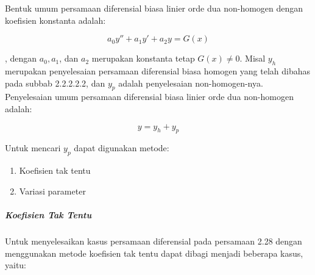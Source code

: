 Bentuk umum persamaan diferensial biasa linier orde dua non-homogen dengan koefisien konstanta adalah:

\begin{equation} a_0 y'' + a_1 y' + a_2 y = G(x) \end{equation}

, dengan \begin{math} a_0, a_1 \end{math}, dan \begin{math} a_2 \end{math} merupakan konstanta tetap \begin{math} G(x) \neq 0 \end{math}. Misal \begin{math} y_h \end{math} merupakan penyelesaian persamaan diferensial biasa homogen yang telah dibahas pada subbab 2.2.2.2.2, dan \begin{math} y_p \end{math} adalah penyelesaian non-homogen-nya. Penyelesaian umum persamaan diferensial biasa linier orde dua non-homogen adalah:

\begin{equation} y = y_h + y_p \end{equation}

Untuk mencari \begin{math} y_p \end{math} dapat digunakan metode:

\begin{enumerate}[1.]

	\item Koefisien tak tentu
	\item Variasi parameter

\end{enumerate}

\subparagraph{Koefisien Tak Tentu}
\label{parff:koefisien1}

Untuk menyelesaikan kasus persamaan diferensial pada persamaan 2.28 dengan menggunakan metode koefisien tak tentu dapat dibagi menjadi beberapa kasus, yaitu:

